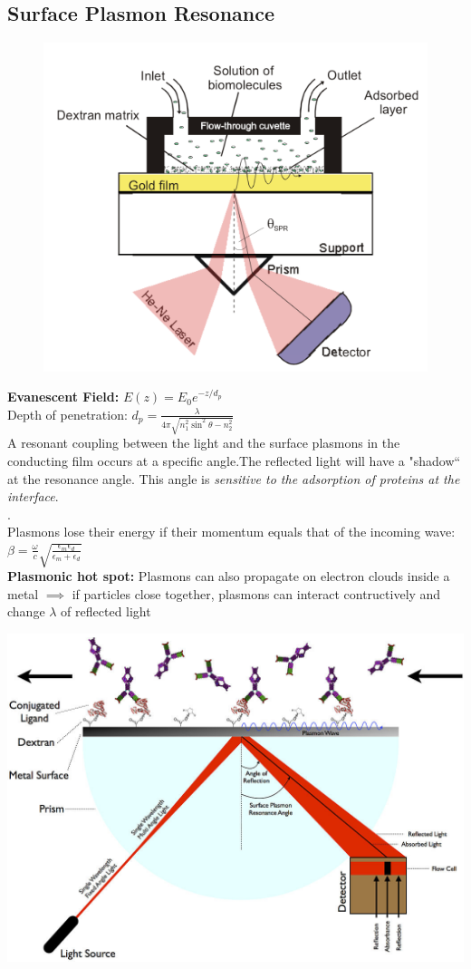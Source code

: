 \documentclass[9pt]{article}
\begin{document}
\begin{multicols}{2}
    \subsection{Surface Plasmon Resonance}
\begin{figure}
\includegraphics[width=\linewidth]{Images/surface_plasmon_resonance.png}
\end{figure}
\textbf{Evanescent Field: } $E(z)=E_0 e^{-z/d_p}$\\
Depth of penetration: $d_p = \frac{\lambda}{4\pi \sqrt{n_1 ^2 \sin ^2 \theta -n_2 ^2}}$\\
A resonant coupling between the light and the surface plasmons in the conducting film occurs at a specific angle.The reflected light will have a "shadow“ at the resonance angle. This angle is \textit{sensitive to the adsorption of proteins at the interface}. \\
.\\
Plasmons lose their energy if their momentum equals that of the incoming wave: $\beta = \frac{\omega}{c}\sqrt{\frac{\epsilon _m \epsilon _d}{\epsilon _m + \epsilon _d}}$\\
\textbf{Plasmonic hot spot: } Plasmons can also propagate on electron clouds inside a metal $\implies$ if particles close together, plasmons can interact contructively and change $\lambda$ of reflected light

\includegraphics[width=0.5\linewidth]{Images/Surface_Plasmon_Resonance.jpg}


\end{multicols}
\end{document}

